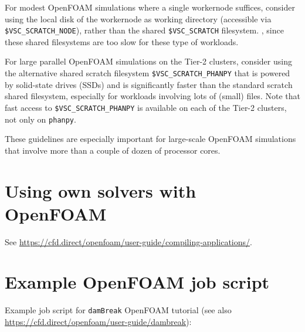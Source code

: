 For modest OpenFOAM simulations where a single workernode suffices, consider using the local disk of the
workernode as working directory (accessible via \lstinline|$VSC_SCRATCH_NODE|),
rather than the shared \lstinline|$VSC_SCRATCH| filesystem. , since these shared filesystems are too slow for these type of workloads.

\ifgent
For large parallel OpenFOAM simulations on the \university Tier-2 clusters, consider using the
alternative shared scratch filesystem \lstinline|$VSC_SCRATCH_PHANPY| that is powered by
solid-state drives (SSDs) and is significantly faster than the standard scratch
shared filesystem, especially for workloads involving lots of (small) files. Note that fast access to
\lstinline|$VSC_SCRATCH_PHANPY| is available on each of the \university Tier-2 clusters, not only on \lstinline|phanpy|.
\fi

These guidelines are especially important for large-scale OpenFOAM simulations that involve
more than a couple of dozen of processor cores.


\section{Using own solvers with OpenFOAM}
\label{sec:best-practices-openfoam-own-solvers-libraries}

See \url{https://cfd.direct/openfoam/user-guide/compiling-applications/}.

\section{Example OpenFOAM job script}
\label{sec:best-practices-openfoam-example-script}

Example job script for \lstinline|damBreak| OpenFOAM tutorial
(see also \url{https://cfd.direct/openfoam/user-guide/dambreak}):

